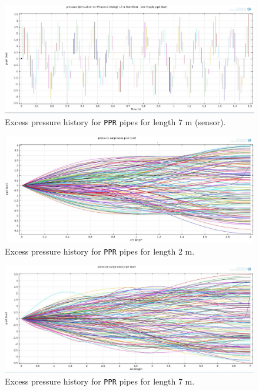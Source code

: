 \begin{figure}[htbp]
\hspace*{-0.1\textwidth}\includegraphics[width=1.2\textwidth]{./water-hammer/PPR/PPR-7-sensor}
\caption{Excess pressure history for \texttt{PPR} pipes for length 7 m (sensor).}
\label{ppr2}
\end{figure}

\begin{figure}[htbp]
\hspace*{-0.1\textwidth}\includegraphics[width=1.2\textwidth]{./water-hammer/PPR/PPR-2}
\caption{Excess pressure history for \texttt{PPR} pipes for length 2 m.}
\label{ppr3}
\end{figure}

\begin{figure}[htbp]
\hspace*{-0.1\textwidth}\includegraphics[width=1.2\textwidth]{./water-hammer/PPR/PPR-7}
\caption{Excess pressure history for \texttt{PPR} pipes for length 7 m.}
\label{ppr4}
\end{figure}

